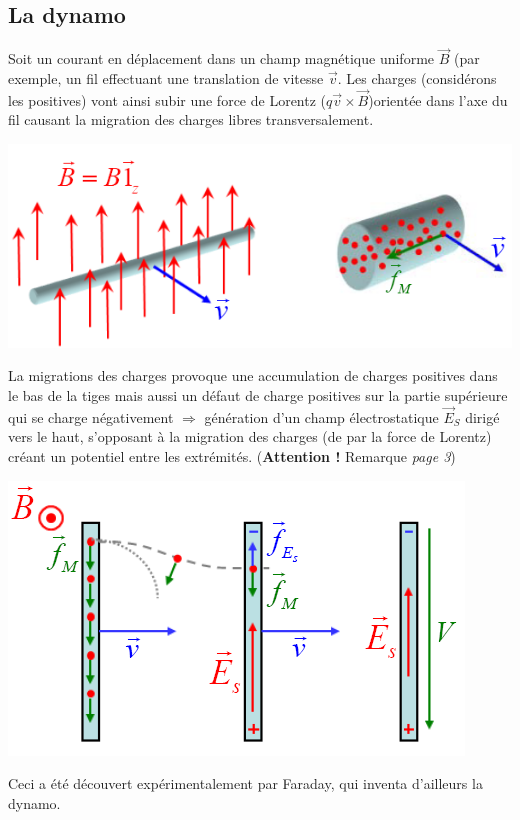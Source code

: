 \documentclass	[11pt, a4paper, openany]{book}
\begin{document}
\subsection{La dynamo}
Soit un courant en déplacement dans un champ magnétique uniforme $\vec{B}$ (par exemple, un fil effectuant une translation de vitesse $\vec{v}$. Les charges (considérons les positives) vont ainsi subir une force de Lorentz ($q\vec{v} \times \vec{B}$)orientée dans l'axe du fil causant la migration des charges libres transversalement.
\begin{center}
	\includegraphics[scale=0.35]{em/image0.png}\\
\end{center}
La migrations des charges provoque une accumulation de charges positives dans le bas de la tiges mais aussi un défaut de charge positives sur la partie supérieure qui se charge négativement $\Rightarrow$ génération d'un champ électrostatique $\vec{E}_S$ dirigé vers le haut, s'opposant à la migration des charges (de par la force de Lorentz) créant un potentiel entre les extrémités. (\textbf{Attention !} Remarque \textit{page 3})
\begin{center}
	\includegraphics[scale=0.55]{em/image1.png}\\
\end{center}
Ceci a été découvert expérimentalement par Faraday, qui inventa d'ailleurs la dynamo.\\
\end{document}
